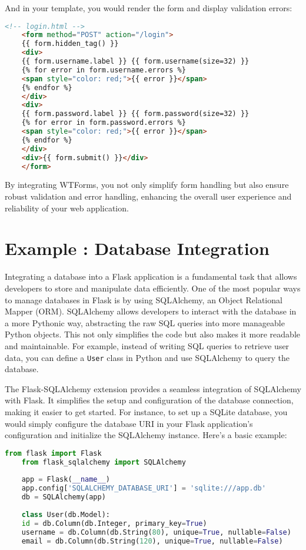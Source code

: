 And in your template, you would render the form and display validation errors:

\begin{lstlisting}[language=HTML]
	<!-- login.html -->
	<form method="POST" action="/login">
	{{ form.hidden_tag() }}
	<div>
	{{ form.username.label }} {{ form.username(size=32) }}
	{% for error in form.username.errors %}
	<span style="color: red;">{{ error }}</span>
	{% endfor %}
	</div>
	<div>
	{{ form.password.label }} {{ form.password(size=32) }}
	{% for error in form.password.errors %}
	<span style="color: red;">{{ error }}</span>
	{% endfor %}
	</div>
	<div>{{ form.submit() }}</div>
	</form>
\end{lstlisting}

By integrating WTForms, you not only simplify form handling but also ensure robust validation and error handling, enhancing the overall user experience and reliability of your web application.\cite{Grinberg:2018}

\section{Example : Database Integration}

Integrating a database into a Flask application is a fundamental task that allows developers to store and manipulate data efficiently. One of the most popular ways to manage databases in Flask is by using SQLAlchemy, an Object Relational Mapper (ORM). SQLAlchemy allows developers to interact with the database in a more Pythonic way, abstracting the raw SQL queries into more manageable Python objects. This not only simplifies the code but also makes it more readable and maintainable. For example, instead of writing SQL queries to retrieve user data, you can define a \texttt{User} class in Python and use SQLAlchemy to query the database.

The Flask-SQLAlchemy extension provides a seamless integration of SQLAlchemy with Flask. It simplifies the setup and configuration of the database connection, making it easier to get started. For instance, to set up a SQLite database, you would simply configure the database URI in your Flask application's configuration and initialize the SQLAlchemy instance. Here's a basic example:

\begin{lstlisting}[language=Python]
	from flask import Flask
	from flask_sqlalchemy import SQLAlchemy
	
	app = Flask(__name__)
	app.config['SQLALCHEMY_DATABASE_URI'] = 'sqlite:///app.db'
	db = SQLAlchemy(app)
	
	class User(db.Model):
	id = db.Column(db.Integer, primary_key=True)
	username = db.Column(db.String(80), unique=True, nullable=False)
	email = db.Column(db.String(120), unique=True, nullable=False)
\end{lstlisting}

